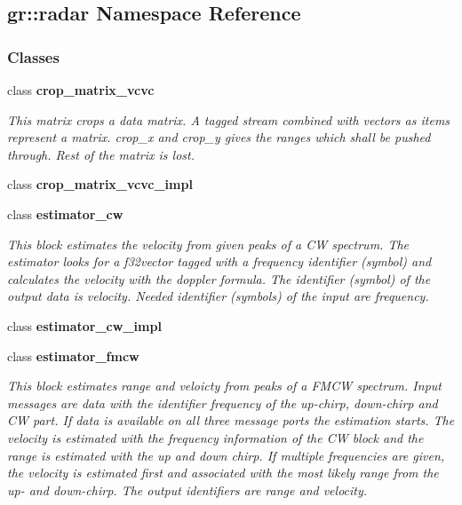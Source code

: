 \subsection{gr\+:\+:radar Namespace Reference}
\label{namespacegr_1_1radar}
\subsubsection*{Classes}
\begin{DoxyCompactItemize}
\item 
class {\bf crop\+\_\+matrix\+\_\+vcvc}
\begin{DoxyCompactList}\small\item\em This matrix crops a data matrix. A tagged stream combined with vectors as items represent a matrix. crop\+\_\+x and crop\+\_\+y gives the ranges which shall be pushed through. Rest of the matrix is lost. \end{DoxyCompactList}\item 
class {\bf crop\+\_\+matrix\+\_\+vcvc\+\_\+impl}
\item 
class {\bf estimator\+\_\+cw}
\begin{DoxyCompactList}\small\item\em This block estimates the velocity from given peaks of a CW spectrum. The estimator looks for a f32vector tagged with a \textquotesingle{}frequency\textquotesingle{} identifier (symbol) and calculates the velocity with the doppler formula. The identifier (symbol) of the output data is \textquotesingle{}velocity\textquotesingle{}. Needed identifier (symbols) of the input are \textquotesingle{}frequency\textquotesingle{}. \end{DoxyCompactList}\item 
class {\bf estimator\+\_\+cw\+\_\+impl}
\item 
class {\bf estimator\+\_\+fmcw}
\begin{DoxyCompactList}\small\item\em This block estimates range and veloicty from peaks of a F\+M\+CW spectrum. Input messages are data with the identifier \textquotesingle{}frequency\textquotesingle{} of the up-\/chirp, down-\/chirp and CW part. If data is available on all three message ports the estimation starts. The velocity is estimated with the frequency information of the CW block and the range is estimated with the up and down chirp. If multiple frequencies are given, the velocity is estimated first and associated with the most likely range from the up-\/ and down-\/chirp. The output identifiers are \textquotesingle{}range\textquotesingle{} and \textquotesingle{}velocity\textquotesingle{}. \end{DoxyCompactList}\item 

\end{DoxyCompactItemize}
